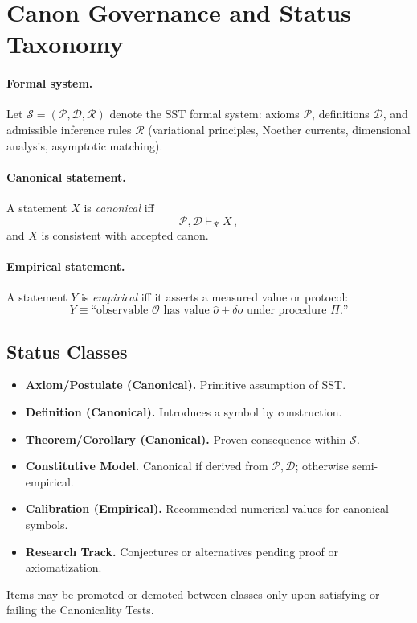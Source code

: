 \documentclass[10pt,reprint,aps,onecolumn,nofootinbib]{revtex4-2}
\begin{document}
    \section{Canon Governance and Status Taxonomy}\label{canon58:governance}
        \paragraph{Formal system.}
            Let $\mathcal{S}=(\mathcal{P},\mathcal{D},\mathcal{R})$ denote the SST formal system: axioms $\mathcal{P}$, definitions $\mathcal{D}$, and admissible inference rules $\mathcal{R}$ (variational principles, Noether currents, dimensional analysis, asymptotic matching).
        \paragraph{Canonical statement.}
            A statement $X$ is \emph{canonical} iff
            \[
                \mathcal{P},\mathcal{D}\vdash_{\mathcal{R}} X\,,
            \]
            and $X$ is consistent with accepted canon. %
        \paragraph{Empirical statement.}
            A statement $Y$ is \emph{empirical} iff it asserts a measured value or protocol:
            \[
                Y \equiv \text{``observable $\mathcal{O}$ has value $\hat{o}\pm\delta o$ under procedure $\Pi$.''}
            \]
    \subsection*{Status Classes}
    \begin{itemize}
    \item \textbf{Axiom/Postulate (Canonical).} Primitive assumption of SST.
    \item \textbf{Definition (Canonical).} Introduces a symbol by construction.
    \item \textbf{Theorem/Corollary (Canonical).} Proven consequence within $\mathcal{S}$.
    \item \textbf{Constitutive Model.} Canonical if derived from $\mathcal{P},\mathcal{D}$; otherwise semi-empirical.
    \item \textbf{Calibration (Empirical).} Recommended numerical values for canonical symbols.
    \item \textbf{Research Track.} Conjectures or alternatives pending proof or axiomatization.
    \end{itemize}
    Items may be promoted or demoted between classes only upon satisfying or failing the Canonicality Tests.
\end{document}
